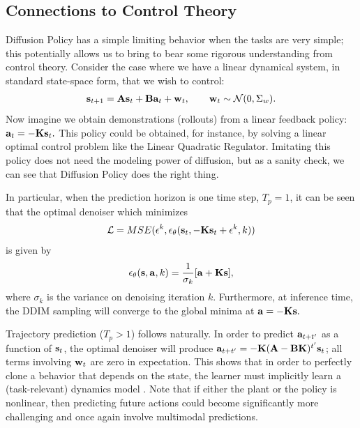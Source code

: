 \documentclass[Afour,sageh,times]{sagej}
\begin{document}
\subsection{Connections to Control Theory}
\label{sec:control}
Diffusion Policy has a simple limiting behavior when the tasks are very simple; this potentially allows us to bring to bear some rigorous understanding from control theory. Consider the case where we have a linear dynamical system, in standard state-space form, that we wish to control:
\begin{gather*}
{\bf s}_{t+1} = {\bf A}{\bf s}_t + {\bf B}{\bf a}_t + {\bf w}_t, \qquad {\bf w}_t \sim \mathcal{N}(0, \Sigma_w).
\end{gather*} Now imagine we obtain demonstrations (rollouts) from a linear feedback policy: ${\bf a}_t = -{\bf K}{\bf s}_t.$ This policy could be obtained, for instance, by solving a linear optimal control problem like the Linear Quadratic Regulator. Imitating this policy does not need the modeling power of diffusion, but as a sanity check, we can see that Diffusion Policy does the right thing.

In particular, when the prediction horizon is one time step, $T_p=1$, it can be seen that the optimal denoiser which minimizes
\begin{equation}
    \mathcal{L}=MSE(\mathbf{\epsilon}^k,\epsilon_\theta(\mathbf{s}_t, -{\bf K}{\bf s}_t + \mathbf{\epsilon}^k, k))
\end{equation}
is given by $$\epsilon_\theta({\bf s}, {\bf a}, k) = \frac{1}{\sigma_k}[{\bf a} + {\bf K}{\bf s}],$$ where $\sigma_k$ is the variance on denoising iteration $k$. Furthermore, at inference time, the DDIM sampling will converge to the global minima at ${\bf a} = -{\bf Ks}.$

Trajectory prediction ($T_p>1$) follows naturally. In order to predict ${\bf a}_{t+t'}$ as a function of ${\bf s}_t$, the optimal denoiser will produce ${\bf a}_{t+t'} = -{\bf K}({\bf A}-{\bf BK})^{t'}{\bf s}_t$; all terms involving ${\bf w}_t$ are zero in expectation. This shows that in order to perfectly clone a behavior that depends on the state, the learner must implicitly learn a (task-relevant) dynamics model \cite{subramanian2019approximate,zhang2020learning}. Note that if either the plant or the policy is nonlinear, then predicting future actions could become significantly more challenging and once again involve multimodal predictions.
\end{document}
